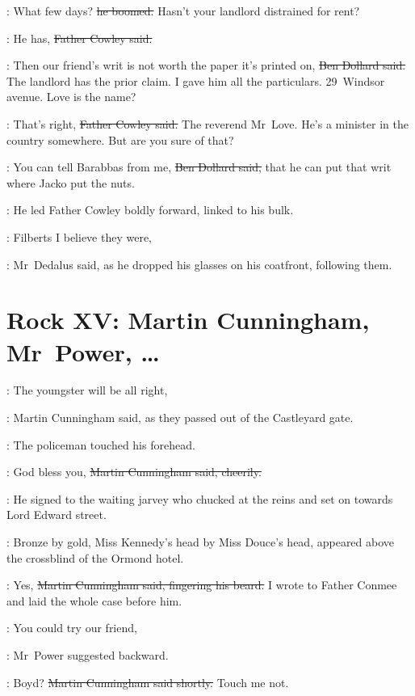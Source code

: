 \dollard:
What few days?
\sout{he boomed.}
Hasn't your landlord distrained for rent?

\cowley:
He has,
\sout{Father Cowley said.}

\dollard:
Then our friend's writ is not worth the paper it's printed on,
\sout{Ben Dollard said.}
The landlord has the prior claim.
I gave him all the particulars.
29~Windsor avenue.
Love is the name?

\cowley:
That's right,
\sout{Father Cowley said.}
The reverend Mr~Love.
He's a minister in the country somewhere.
But are you sure of that?

\dollard:
You can tell Barabbas from me,
\sout{Ben Dollard said,}%
that he can put that writ where Jacko put the nuts.

:
He led Father Cowley boldly forward,
linked to his bulk.

\simon:
Filberts I believe they were,

:
Mr~Dedalus said,
as he dropped his
glasses on his coatfront,
following them.


\section*{Rock XV: Martin Cunningham, Mr~Power, \ldots}


\cunningham:
The youngster will be all right,

:
Martin Cunningham said,
as they passed
out of the Castleyard gate.

:
The policeman touched his forehead.

\cunningham:
God bless you,
\sout{Martin Cunningham said, cheerily.}

:
He signed to the waiting jarvey%
who chucked at the reins
and set on towards Lord Edward street.

\begin{interject}
    :
    Bronze by gold,
    Miss Kennedy's head by Miss Douce's head,
    appeared above
    the crossblind of the Ormond hotel.
\end{interject}

\cunningham:
Yes,
\sout{Martin Cunningham said,
fingering his beard.}
I wrote to Father Conmee and laid the whole case before him.

\power:
You could try our friend,

:
Mr~Power suggested backward.

\cunningham:
Boyd?
\sout{Martin Cunningham said shortly.}
Touch me not.

